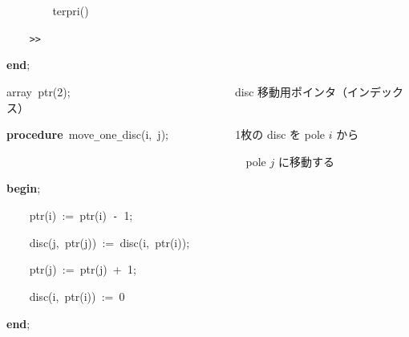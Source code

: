 \documentclass[a4paper,10pt]{article}
\def\mc{\relax}
\begin{document}
\noindent
\mbox{}{\tt\mc \ }{\tt\mc \ }{\tt\mc \ }{\tt\mc \ }{\tt\mc \ }{\tt\mc \ }{\tt\mc \ }{\tt\mc \ }terpri()

\noindent
\mbox{}{\tt\mc \ }{\tt\mc \ }{\tt\mc \ }{\tt\mc \ }{\tt >}{\tt >}

\noindent
\mbox{}\textbf{end};

\noindent
\mbox{}\hfill

\noindent
\mbox{}array{\tt\mc \ }ptr(2);{\tt\mc \ }{\tt\mc \ }{\tt\mc \ }{\tt\mc \ }{\tt\mc \ }{\tt\mc \ }{\tt\mc \ }{\tt\mc \ }{\tt\mc \ }{\tt\mc \ }{\tt\mc \ }{\tt\mc \ }{\tt\mc \ }{\tt\mc \ }{\tt\mc \ }{\tt\mc \ }{\tt\mc \ }{\tt\mc \ }{\tt\mc \ }{\tt\mc \ }{\tt\mc \ }{\tt\mc \ }{\tt\mc \ }{\tt\mc \ }{\tt\mc \ }{\tt\mc \ }{\tt\mc \ }\rm\mc {\tt\%} \ disc 移動用ポインタ（インデックス）\hfill
\tt\mc 

\noindent
\mbox{}\hfill

\noindent
\mbox{}\textbf{procedure}{\tt\mc \ }move{\tt\_}one{\tt\_}disc(i,{\tt\mc \ }j);{\tt\mc \ }{\tt\mc \ }{\tt\mc \ }{\tt\mc \ }{\tt\mc \ }{\tt\mc \ }{\tt\mc \ }{\tt\mc \ }{\tt\mc \ }{\tt\mc \ }\rm\mc {\tt\%} \ 1枚の disc を pole $i$ から\hfill
\tt\mc 

\noindent
\mbox{}{\tt\mc \ }{\tt\mc \ }{\tt\mc \ }{\tt\mc \ }{\tt\mc \ }{\tt\mc \ }{\tt\mc \ }{\tt\mc \ }{\tt\mc \ }{\tt\mc \ }{\tt\mc \ }{\tt\mc \ }{\tt\mc \ }{\tt\mc \ }{\tt\mc \ }{\tt\mc \ }{\tt\mc \ }{\tt\mc \ }{\tt\mc \ }{\tt\mc \ }{\tt\mc \ }{\tt\mc \ }{\tt\mc \ }{\tt\mc \ }{\tt\mc \ }{\tt\mc \ }{\tt\mc \ }{\tt\mc \ }{\tt\mc \ }{\tt\mc \ }{\tt\mc \ }{\tt\mc \ }{\tt\mc \ }{\tt\mc \ }{\tt\mc \ }{\tt\mc \ }{\tt\mc \ }{\tt\mc \ }{\tt\mc \ }{\tt\mc \ }\rm\mc {\tt\%} \ pole $j$ に移動する \hfill
\tt\mc 

\noindent
\mbox{}\textbf{begin};

\noindent
\mbox{}{\tt\mc \ }{\tt\mc \ }{\tt\mc \ }{\tt\mc \ }ptr(i){\tt\mc \ }:={\tt\mc \ }ptr(i){\tt\mc \ }{\tt -}{\tt\mc \ }1;

\noindent
\mbox{}{\tt\mc \ }{\tt\mc \ }{\tt\mc \ }{\tt\mc \ }disc(j,{\tt\mc \ }ptr(j)){\tt\mc \ }:={\tt\mc \ }disc(i,{\tt\mc \ }ptr(i));

\noindent
\mbox{}{\tt\mc \ }{\tt\mc \ }{\tt\mc \ }{\tt\mc \ }ptr(j){\tt\mc \ }:={\tt\mc \ }ptr(j){\tt\mc \ }+{\tt\mc \ }1;

\noindent
\mbox{}{\tt\mc \ }{\tt\mc \ }{\tt\mc \ }{\tt\mc \ }disc(i,{\tt\mc \ }ptr(i)){\tt\mc \ }:={\tt\mc \ }0

\noindent
\mbox{}\textbf{end};

\noindent
\mbox{}\hfill
\end{document}
